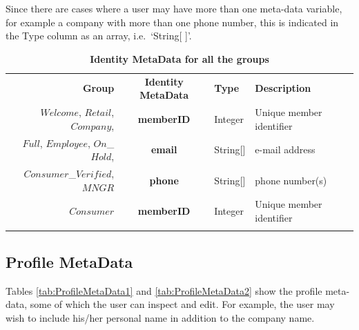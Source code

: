 Since there are cases where a user may have more than one meta-data variable, for example a company with more than one phone number, this is indicated in the Type column as an array, i.e.\ `String[ ]'.

\begin{table}[H]
\vspace{-0.5cm}
\begin{centering}
\small
{
\begin{tabular}{ r | c | l | l }
\hline
\textbf{Group}	& {\bf Identity MetaData} & {\bf Type} & {\bf Description} \\
\Xhline{1.5pt}
$Welcome$, $Retail$, $Company$,	& {\bf memberID}			&Integer	& Unique member identifier \\
$Full$, $Employee$, $On$\_$Hold$,	& {\bf email}				&String[]	& e-mail address \\		
$Consumer$\_$Verified$, $MNGR$	& {\bf phone}				&String[]	& phone number(s) \\
\hline
$Consumer$	& {\bf memberID}	&Integer & Unique member identifier \\
\Xhline{1.5pt}
\end{tabular}
}
\caption{\small\textbf{Identity MetaData for all the groups}}
\label{tab:IdentityMetaData}
\end{centering}
\vspace{-1cm}
\end{table}

\subsection{Profile MetaData}
Tables \ref{tab:ProfileMetaData1} and \ref{tab:ProfileMetaData2} show the profile meta-data, some of which the user can inspect and edit. For example, the user may wish to include his/her personal name in addition to the company name.

